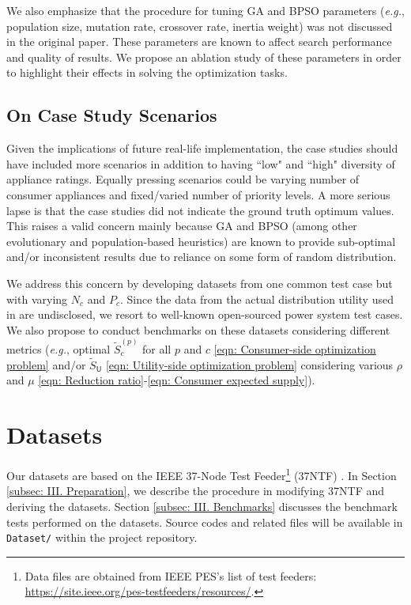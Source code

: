 \documentclass[journal, a4paper]{IEEEtran}
\begin{document}
We also emphasize that the procedure for tuning GA and BPSO parameters
(\textit{e.g.}, population size, mutation rate, crossover rate, inertia weight)
was not discussed in the original paper.
These parameters are known to affect search performance and quality of results.
We propose an ablation study of these parameters in order to highlight their effects in solving the optimization tasks.

\subsection{On Case Study Scenarios}
\label{subsec: II. On Case Study Scenarios}

Given the implications of future real-life implementation,
the case studies should have included more scenarios
in addition to having ``low" and ``high" diversity of appliance ratings.
Equally pressing scenarios could be varying number of consumer appliances and fixed/varied number of priority levels.
A more serious lapse is that the case studies did not indicate the ground truth optimum values.
This raises a valid concern mainly because GA and BPSO
(among other evolutionary and population-based heuristics)
are known to provide sub-optimal and/or inconsistent results due to reliance on some form of random distribution.

We address this concern by developing datasets from one common test case but with varying $N_c$ and $P_c$.
Since the data from the actual distribution utility used in \cite{Jabian2020} are undisclosed,
we resort to well-known open-sourced power system test cases.
We also propose to conduct benchmarks on these datasets considering different metrics
(\textit{e.g.}, optimal $\tilde{S}_{c}^{\left(p\right)}$ for all $p$ and $c$ \eqref{eqn: Consumer-side optimization problem}
and/or $\tilde{S}_{\mathsf{U}}$ \eqref{eqn: Utility-side optimization problem}
considering various $\rho$ and $\mu$ \eqref{eqn: Reduction ratio}-\eqref{eqn: Consumer expected supply}).

\section{Datasets}
\label{sec: Datasets}

Our datasets are based on the IEEE 37-Node Test Feeder\footnote{
	Data files are obtained from IEEE PES's list of test feeders:
	\url{https://site.ieee.org/pes-testfeeders/resources/}.
}
(37NTF) \cite{Kersting2001}.
In Section \ref{subsec: III. Preparation}, we describe the procedure in modifying 37NTF and deriving the datasets.
Section \ref{subsec: III. Benchmarks} discusses the benchmark tests performed on the datasets.
Source codes and related files will be available in \texttt{Dataset/} within the project repository.
\end{document}
